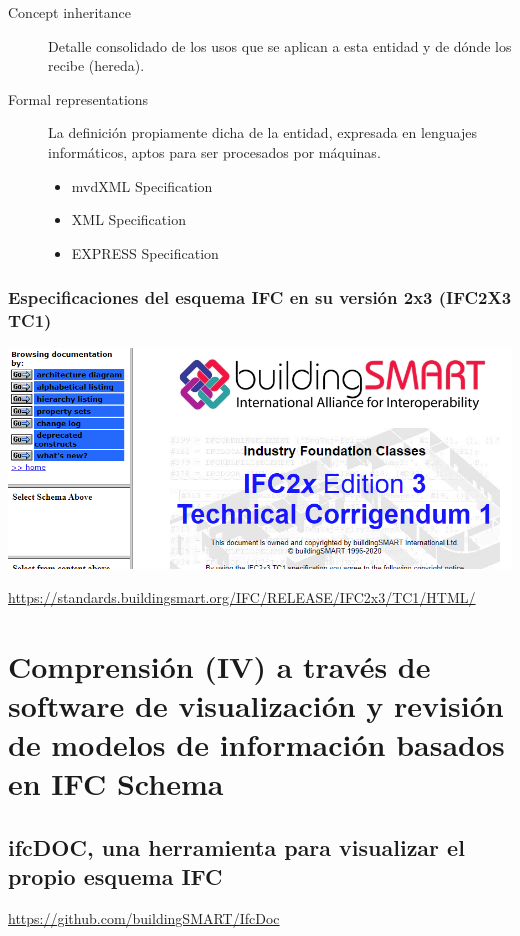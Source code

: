 \documentclass[spanish,10pt,a4paper,final,oneside]{article}
\begin{document}
\begin{description}
\item[Concept inheritance] Detalle consolidado de los usos que se aplican a esta entidad y de dónde los recibe (hereda).

\item[Formal representations] La definición propiamente dicha de la entidad, expresada en lenguajes informáticos, aptos para ser procesados por máquinas.
\begin{itemize}
\item mvdXML Specification
\item XML Specification 
\item EXPRESS Specification
\end{itemize}

\end{description}



\vspace{4cm}
\subsubsection{Especificaciones del esquema IFC en su versión 2x3 (IFC2X3 TC1)}

\includegraphics[width=\textwidth]{IFC2X3 - Portada}

\url{https://standards.buildingsmart.org/IFC/RELEASE/IFC2x3/TC1/HTML/}





\newpage
\section{Comprensión (IV) a través de software de visualización y revisión de modelos de información basados en IFC Schema}

\subsection{ifcDOC, una herramienta para visualizar el propio esquema IFC}
\url{https://github.com/buildingSMART/IfcDoc}
\end{document}
